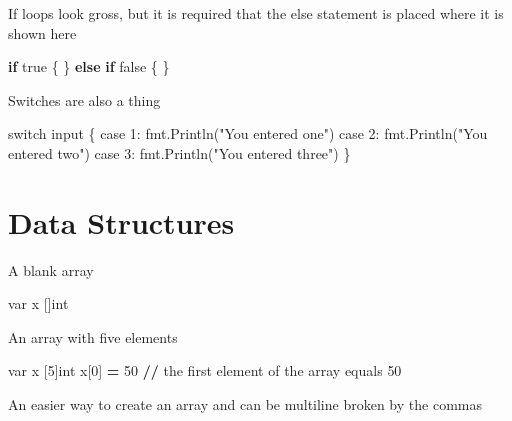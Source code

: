 \documentclass[]{book}
\newenvironment{Shaded}{\begin{snugshade}}{\end{snugshade}}
\newcommand{\DecValTok}[1]{\textcolor[rgb]{0.00,0.00,0.81}{#1}}
\newcommand{\StringTok}[1]{\textcolor[rgb]{0.31,0.60,0.02}{#1}}
\newcommand{\ControlFlowTok}[1]{\textcolor[rgb]{0.13,0.29,0.53}{\textbf{#1}}}
\newcommand{\OperatorTok}[1]{\textcolor[rgb]{0.81,0.36,0.00}{\textbf{#1}}}
\newcommand{\BuiltInTok}[1]{#1}
\newcommand{\NormalTok}[1]{#1}
\begin{document}
If loops look gross, but it is required that the else statement is
placed where it is shown here

\begin{Shaded}
\begin{Highlighting}[]
\ControlFlowTok{if}\NormalTok{ true \{}
\NormalTok{\} }\ControlFlowTok{else} \ControlFlowTok{if}\NormalTok{ false \{}
\NormalTok{\}}
\end{Highlighting}
\end{Shaded}

Switches are also a thing

\begin{Shaded}
\begin{Highlighting}[]
\NormalTok{switch }\BuiltInTok{input}\NormalTok{ \{                          }
\NormalTok{    case }\DecValTok{1}\NormalTok{: fmt.Println(}\StringTok{"You entered one"}\NormalTok{)  }
\NormalTok{    case }\DecValTok{2}\NormalTok{: fmt.Println(}\StringTok{"You entered two"}\NormalTok{)  }
\NormalTok{    case }\DecValTok{3}\NormalTok{: fmt.Println(}\StringTok{"You entered three"}\NormalTok{)}
\NormalTok{\}                                           }
\end{Highlighting}
\end{Shaded}

\section{Data Structures}\label{data-structures}

A blank array

\begin{Shaded}
\begin{Highlighting}[]
\NormalTok{var x []}\BuiltInTok{int}
\end{Highlighting}
\end{Shaded}

An array with five elements

\begin{Shaded}
\begin{Highlighting}[]
\NormalTok{var x [}\DecValTok{5}\NormalTok{]}\BuiltInTok{int}
\NormalTok{x[}\DecValTok{0}\NormalTok{] }\OperatorTok{=} \DecValTok{50} \OperatorTok{//}\NormalTok{ the first element of the array equals }\DecValTok{50}
\end{Highlighting}
\end{Shaded}

An easier way to create an array and can be multiline broken by the
commas
\end{document}
